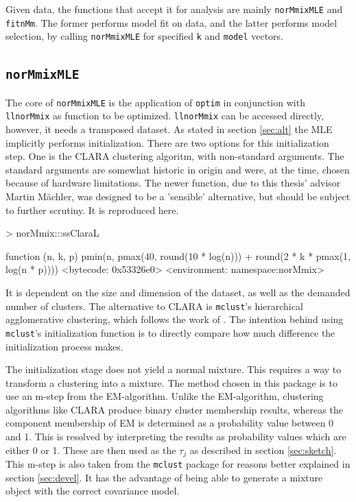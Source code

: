 Given data, the functions that accept it for analysis are mainly 
{\tt norMmixMLE} and {\tt fitnMm}. The former performs model fit on data, and 
the latter performs model selection, by calling {\tt norMmixMLE} for specified
{\tt k} and {\tt model} vectors. 

\subsection{{\tt norMmixMLE}}

The core of {\tt norMmixMLE} is the application of {\tt optim} in conjunction
with {\tt llnorMmix} as function to be optimized. {\tt llnorMmix} can be 
accessed directly, however, it needs a transposed dataset.
As stated in section \ref{sec:alt} the MLE implicitly performs initialization.
There are two options for this initialization step. One is the CLARA clustering
algoritm, with non-standard arguments. The standard arguments are somewhat 
historic in origin and were, at the time, chosen because of hardware 
limitations. The newer function, due to this thesis' advisor Martin M\"achler, 
was designed to be a 'sensible' alternative, but should be subject to further 
scrutiny. It is reproduced here.

\begin{Schunk}
\begin{Sinput}
>     norMmix:::ssClaraL
\end{Sinput}
\begin{Soutput}
function (n, k, p) 
pmin(n, pmax(40, round(10 * log(n))) + round(2 * k * pmax(1, 
    log(n * p))))
<bytecode: 0x53326e0>
<environment: namespace:norMmix>
\end{Soutput}
\end{Schunk}

It is dependent on the size and dimension of the dataset, as well as the 
demanded number of clusters.
The alternative to CLARA is {\tt mclust}'s hierarchical agglomerative 
clustering, which follows the work of \cite{Fra98}. The intention behind using 
{\tt mclust}'s initialization function is to directly compare how much 
difference the initialization process makes.

The initialization stage does not yield a normal mixture. This requires a way
to transform a clustering into a mixture. The method chosen in this package is
to use an m-step from the EM-algorithm. Unlike the EM-algorithm, clustering 
algorithms like CLARA produce binary cluster membership results, whereas the 
component membership of EM is determined as a probability value between 0 and 1.
This is resolved by interpreting the results as probability values which are 
either 0 or 1. These are then used as the $\tau_j$ as described in section 
\ref{sec:sketch}. This m-step is also taken from the {\tt mclust} package for 
reasons better explained in section \ref{sec:devel}.
It has the advantage of being able to generate a mixture object with the 
correct covariance model.

